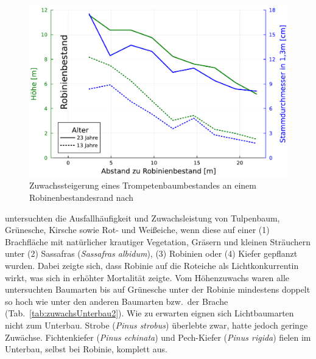 \documentclass[twocolumn]{scrartcl}
\begin{document}
\begin{figure}[htbp]
  \centering
  \includegraphics[width=.9\linewidth]{./bild/bestandesrand}
  \caption{Zuwachssteigerung eines Trompetenbaumbestandes an einem
    Robinenbestandesrand nach
    \citet{ferguson1922robinie,chapman1935robinie}}
  \label{fig:bestandesrand}
\end{figure}

\citet{chapman1951robinieSchirm} untersuchten die Ausfallhäufigkeit
und Zuwachsleistung von Tulpenbaum, Grünesche, Kirsche sowie Rot- und
Weißeiche, wenn diese auf einer (1) Brachfläche mit natürlicher
krautiger Vegetation, Gräsern und kleinen Sträuchern unter (2)
Sassafras (\emph{Sassafras albidum}), (3) Robinien oder (4) Kiefer
gepflanzt wurden. Dabei zeigte sich, dass Robinie auf die Roteiche als
Lichtkonkurrentin wirkt, was sich in erhöhter Mortalität zeigte. Vom
Höhenzuwachs waren alle untersuchten Baumarten bis auf Grünesche unter
der Robinie mindestens doppelt so hoch wie unter den anderen Baumarten
bzw.\ der Brache (Tab.~\ref{tab:zuwachsUnterbau2}). Wie zu erwarten
eignen sich Lichtbaumarten nicht zum Unterbau. Strobe (\emph{Pinus
strobus}) überlebte zwar, hatte jedoch geringe Zuwächse. Fichtenkiefer
(\emph{Pinus echinata}) und Pech-Kiefer (\emph{Pinus rigida}) fielen
im Unterbau, selbst bei Robinie, komplett aus.
\end{document}
